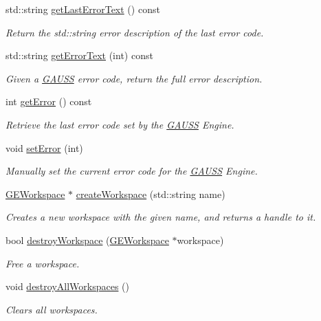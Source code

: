 \begin{DoxyCompactItemize}
std\+::string \hyperlink{class_g_a_u_s_s_a4d8c56b05b0878aa3831ba465c409235}{get\+Last\+Error\+Text} () const
\begin{DoxyCompactList}\small\item\em Return the std\+::string error description of the last error code. \end{DoxyCompactList}\item 
std\+::string \hyperlink{class_g_a_u_s_s_a77ce9d6be867f5a1dbf62ae7ddc5dcaf}{get\+Error\+Text} (int) const
\begin{DoxyCompactList}\small\item\em Given a \hyperlink{class_g_a_u_s_s}{G\+A\+U\+SS} error code, return the full error description. \end{DoxyCompactList}\item 
int \hyperlink{class_g_a_u_s_s_a214b7c251ff80099c04a49e5b5032926}{get\+Error} () const
\begin{DoxyCompactList}\small\item\em Retrieve the last error code set by the \hyperlink{class_g_a_u_s_s}{G\+A\+U\+SS} Engine. \end{DoxyCompactList}\item 
void \hyperlink{class_g_a_u_s_s_a4adc9a33b8be97b1a6592160fea4a4eb}{set\+Error} (int)
\begin{DoxyCompactList}\small\item\em Manually set the current error code for the \hyperlink{class_g_a_u_s_s}{G\+A\+U\+SS} Engine. \end{DoxyCompactList}\item 
\hyperlink{class_g_e_workspace}{G\+E\+Workspace} $\ast$ \hyperlink{class_g_a_u_s_s_a93c2f73d4982037cccfeeeb81dbe7dd2}{create\+Workspace} (std\+::string name)
\begin{DoxyCompactList}\small\item\em Creates a new workspace with the given name, and returns a handle to it. \end{DoxyCompactList}\item 
bool \hyperlink{class_g_a_u_s_s_ab73fd6b8f6cfd5abb906b8e4e344c007}{destroy\+Workspace} (\hyperlink{class_g_e_workspace}{G\+E\+Workspace} $\ast$workspace)
\begin{DoxyCompactList}\small\item\em Free a workspace. \end{DoxyCompactList}\item 
void \hyperlink{class_g_a_u_s_s_ab9515a6de5028f18138e6c87e1512c91}{destroy\+All\+Workspaces} ()
\begin{DoxyCompactList}\small\item\em Clears all workspaces. \end{DoxyCompactList}\item 

\end{DoxyCompactItemize}
